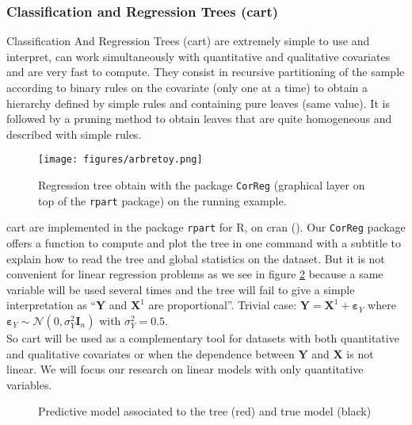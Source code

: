\documentclass[12pt,a4paper]{report}
\begin{document}
	
\subsubsection{Classification and Regression Trees ({\sc cart})}

	
		Classification And Regression Trees ({\sc cart}) \cite{breiman1984classification} are extremely simple to use and interpret, can work simultaneously with quantitative and qualitative covariates and are very fast to compute. They consist in recursive partitioning of the sample according to binary rules on the covariate (only one at a time) to obtain a hierarchy defined by simple rules and containing pure leaves (same value). It is followed by a pruning method to obtain leaves that are quite homogeneous and described with simple rules.\\
		
		\begin{figure}
			\centering
				\texttt{[image: figures/arbretoy.png]} 
			\caption{Regression tree obtain with the package {\tt CorReg}
			 (graphical layer on top of  the {\tt rpart} package) on the running example.}\label{arbretoy}
		\end{figure}
		{\sc cart} are implemented in the package {\tt rpart} 
		for R, on {\sc cran} (\cite{packagerpart}). Our {\tt CorReg} 
		package offers a function to compute and plot the tree in one command with a subtitle to explain how to read the tree and global statistics on the dataset.
		But it is not convenient for linear regression problems as we see in figure \ref{arbretrivial} because a same variable will be used several times and the tree will fail to give a simple interpretation as ``$\boldsymbol{Y}$ and $\boldsymbol{X}^1$ are proportional''. Trivial case: $\boldsymbol{Y}=\boldsymbol{X}^1 + \boldsymbol{\varepsilon}_Y$ where $\boldsymbol{\varepsilon}_Y \sim \mathcal{N}(0, \sigma^2_Y \boldsymbol{I}_n)$ with $\sigma_Y^2=0.5$. \\
		
		So {\sc cart} will be used as a complementary tool for datasets with both quantitative and qualitative covariates or when the dependence between $\boldsymbol{Y}$ and $\boldsymbol{X}$ is not linear. We will focus our research on linear models with only quantitative variables.
	\\
	
\begin{figure}[h!]
	\caption{Predictive model associated to the tree (red) and true model (black)}\label{arbretrivial}
\end{figure}
\end{document}
